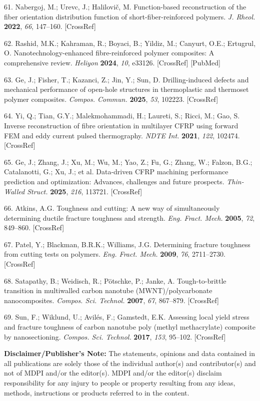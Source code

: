 \documentclass{article}
\begin{document}
\begin{hangpars}
61. Nabergoj, M.; Urevc, J.; Halilovič, M. Function-based reconstruction of the fiber orientation distribution function of short-fiber-reinforced polymers. \emph{J. Rheol.} \textbf{2022}, \emph{66}, 147–160. [CrossRef]

62. Rashid, M.K.; Kahraman, R.; Boyaci, B.; Yildiz, M.; Canyurt, O.E.; Ertugrul, O. Nanotechnology-enhanced fibre-reinforced polymer composites: A comprehensive review. \emph{Heliyon} \textbf{2024}, \emph{10}, e33126. [CrossRef] [PubMed]

63. Ge, J.; Fisher, T.; Kazanci, Z.; Jin, Y.; Sun, D. Drilling-induced defects and mechanical performance of open-hole structures in thermoplastic and thermoset polymer composites. \emph{Compos. Commun.} \textbf{2025}, \emph{53}, 102223. [CrossRef]

64. Yi, Q.; Tian, G.Y.; Malekmohammadi, H.; Laureti, S.; Ricci, M.; Gao, S. Inverse reconstruction of fibre orientation in multilayer CFRP using forward FEM and eddy current pulsed thermography. \emph{NDTE Int.} \textbf{2021}, \emph{122}, 102474. [CrossRef]

65. Ge, J.; Zhang, J.; Xu, M.; Wu, M.; Yao, Z.; Fu, G.; Zhang, W.; Falzon, B.G.; Catalanotti, G.; Xu, J.; et al. Data-driven CFRP machining performance prediction and optimization: Advances, challenges and future prospects. \emph{Thin-Walled Struct.} \textbf{2025}, \emph{216}, 113721. [CrossRef]

66. Atkins, A.G. Toughness and cutting: A new way of simultaneously determining ductile fracture toughness and strength. \emph{Eng. Fract. Mech.} \textbf{2005}, \emph{72}, 849–860. [CrossRef]

67. Patel, Y.; Blackman, B.R.K.; Williams, J.G. Determining fracture toughness from cutting tests on polymers. \emph{Eng. Fract. Mech.} \textbf{2009}, \emph{76}, 2711–2730. [CrossRef]

68. Satapathy, B.; Weidisch, R.; Pötschke, P.; Janke, A. Tough-to-brittle transition in multiwalled carbon nanotube (MWNT)/polycarbonate nanocomposites. \emph{Compos. Sci. Technol.} \textbf{2007}, \emph{67}, 867–879. [CrossRef]

69. Sun, F.; Wiklund, U.; Avilés, F.; Gamstedt, E.K. Assessing local yield stress and fracture toughness of carbon nanotube poly (methyl methacrylate) composite by nanosectioning. \emph{Compos. Sci. Technol.} \textbf{2017}, \emph{153}, 95–102. [CrossRef]
\end{hangpars}

\noindent\textbf{Disclaimer/Publisher’s Note:} The statements, opinions and data contained in all publications are solely those of the individual author(s) and contributor(s) and not of MDPI and/or the editor(s). MDPI and/or the editor(s) disclaim responsibility for any injury to people or property resulting from any ideas, methods, instructions or products referred to in the content.
\end{document}
